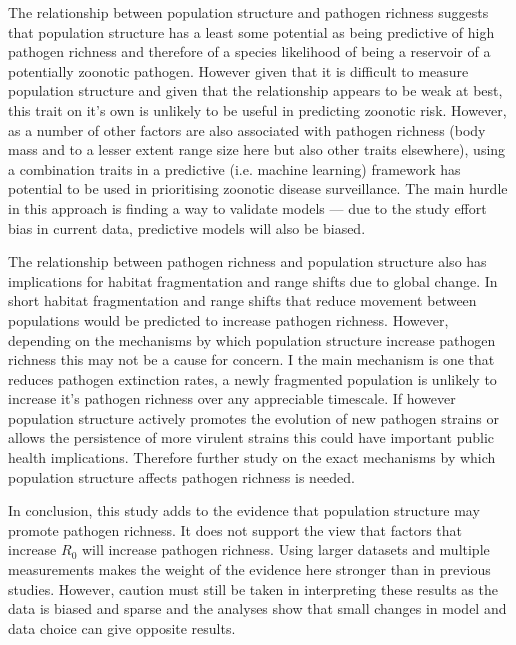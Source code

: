 The relationship between population structure and pathogen richness suggests that population structure has a least some potential as being predictive of high pathogen richness and therefore of a species likelihood of being a reservoir of a potentially zoonotic pathogen. 
However given that it is difficult to measure population structure and given that the relationship appears to be weak at best, this trait on it's own is unlikely to be useful in predicting zoonotic risk.
However, as a number of other factors are also associated with pathogen richness (body mass and to a lesser extent range size here but also other traits elsewhere), using a combination traits in a predictive (i.e. machine learning) framework has potential to be used in prioritising zoonotic disease surveillance.
The main hurdle in this approach is finding a way to validate models --- due to the study effort bias in current data, predictive models will also be biased.

The relationship between pathogen richness and population structure also has implications for habitat fragmentation and range shifts due to global change.
In short habitat fragmentation and range shifts that reduce movement between populations would be predicted to increase pathogen richness.
However, depending on the mechanisms by which population structure increase pathogen richness this may not be a cause for concern.
I the main mechanism is one that reduces pathogen extinction rates, a newly fragmented population is unlikely to increase it's pathogen richness over any appreciable timescale.
If however population structure actively promotes the evolution of new pathogen strains or allows the persistence of more virulent strains this could have important public health implications.
Therefore further study on the exact mechanisms by which population structure affects pathogen richness is needed. 


In conclusion, this study adds to the evidence that population structure may promote pathogen richness.
It does not support the view that factors that increase $R_0$ will increase pathogen richness.
Using larger datasets and multiple measurements makes the weight of the evidence here stronger than in previous studies.
However, caution must still be taken in interpreting these results as the data is biased and sparse and the analyses show that small changes in model and data choice can give opposite results.













